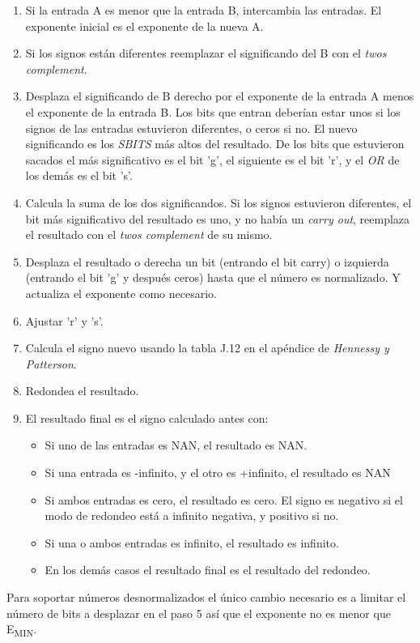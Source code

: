 \documentclass[a4paper]{article}
\begin{document}
\begin{enumerate}[noitemsep]
\item Si la entrada A es menor que la entrada B, intercambia las entradas. El exponente inicial es el exponente de la nueva A.
\item Si los signos están diferentes reemplazar el significando del B con el \textit{twos complement}.
\item Desplaza el significando de B derecho por el exponente de la entrada A menos el exponente de la entrada B. Los bits que entran deberían estar unos si los signos de las entradas estuvieron diferentes, o ceros si no. El nuevo significando es los \textit{SBITS} más altos del resultado. De los bits que estuvieron sacados el más significativo es el bit 'g', el siguiente es el bit 'r', y el \textit{OR} de los demás es el bit 's'.
\item Calcula la suma de los dos significandos. Si los signos estuvieron diferentes, el bit más significativo del resultado es uno, y no había un \textit{carry out}, reemplaza el resultado con el \textit{twos complement} de su mismo.
\item Desplaza el resultado o derecha un bit (entrando el bit carry) o izquierda (entrando el bit 'g' y después ceros) hasta que el número es normalizado. Y actualiza el exponente como necesario.
\item Ajustar 'r' y 's'.
\item Calcula el signo nuevo usando la tabla J.12 en el apéndice de \textit{Hennessy y Patterson}.
\item Redondea el resultado.
\item El resultado final es el signo calculado antes con:
\begin{itemize}[noitemsep]
\item Si uno de las entradas es NAN, el resultado es NAN.
\item Si una entrada es -infinito, y el otro es +infinito, el resultado es NAN
\item Si ambos entradas es cero, el resultado es cero. El signo es negativo si el modo de redondeo está a infinito negativa, y positivo si no.
\item Si una o ambos entradas es infinito, el resultado es infinito.
\item En los demás casos el resultado final es el resultado del redondeo.
\end{itemize}
\end{enumerate}

Para soportar números desnormalizados el único cambio necesario es a limitar el número de bits a desplazar en el paso 5 así que el exponente no es menor que E\textsubscript{MIN}.
\end{document}
